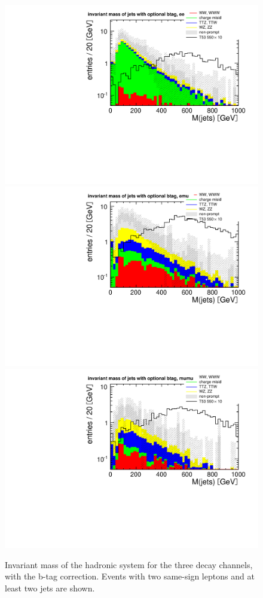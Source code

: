 \begin{figure}[htb]
    \centering
    \includegraphics[width=.7\textwidth]{images/pdf/had_mass_optional_btag_ee_0}
    \includegraphics[width=.7\textwidth]{images/pdf/had_mass_optional_btag_emu_0}
    \includegraphics[width=.7\textwidth]{images/pdf/had_mass_optional_btag_mumu_0}
    \caption{Invariant mass of the hadronic system for the three decay
    channels, with the b-tag correction. Events with two same-sign leptons and at least
two jets are shown.}
    \label{fig:had_mass_optional_btag_app}
\end{figure}

